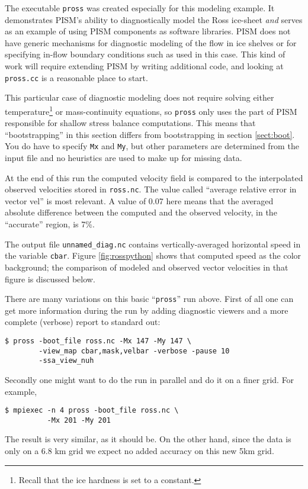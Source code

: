The executable \texttt{pross} was created especially for this modeling example. It demonstrates PISM's ability to diagnostically model the Ross ice-sheet \emph{and} serves as an example of using PISM components as software libraries. PISM does not have generic mechanisms for diagnostic modeling of the flow in ice shelves or for specifying in-flow boundary conditions such as used in this case. This kind of work will require extending PISM by writing additional code, and looking at \texttt{pross.cc} is a reasonable place to start.

This particular case of diagnostic modeling does not require solving either temperature\footnote{Recall that the ice hardness is set to a constant.} or mass-continuity equations, so \texttt{pross} only uses the part of PISM responsible for shallow stress balance computations. This means that ``bootstrapping'' in this section differs from bootstrapping in section \ref{sect:boot}. You do have to specify \texttt{Mx} and \texttt{My}, but other parameters are determined from the input file and no heuristics are used to make up for missing data.

At the end of this run the computed velocity field is compared to the interpolated observed velocities stored in \texttt{ross.nc}.  The value called ``average relative error in vector vel'' is most relevant.  A value of 0.07 here means that the averaged absolute difference between the computed and the observed velocity, in the ``accurate'' region, is 7\%.

The output file \texttt{unnamed_diag.nc} contains vertically-averaged horizontal speed in the variable \texttt{cbar}.  Figure \ref{fig:rosspython} shows that computed speed as the color background; the comparison of modeled and observed vector velocities in that figure is discussed below.

There are many variations on this basic ``\texttt{pross}'' run above.  First of all one can get more information during the run by adding diagnostic viewers and a more complete (verbose) report to standard out:
\begin{verbatim}
$ pross -boot_file ross.nc -Mx 147 -My 147 \
        -view_map cbar,mask,velbar -verbose -pause 10
        -ssa_view_nuh
\end{verbatim}
Secondly one might want to do the run in parallel and do it on a finer grid.  For example,

\begin{verbatim}
$ mpiexec -n 4 pross -boot_file ross.nc \
          -Mx 201 -My 201
\end{verbatim}
The result is very similar, as it should be.  On the other hand, since the data is only on a 6.8 km grid we expect no added accuracy on this new 5km grid.

